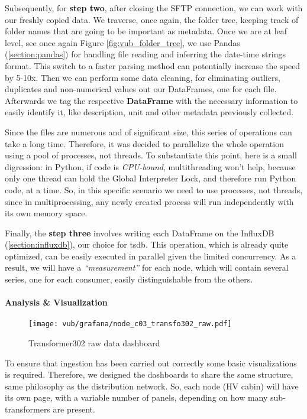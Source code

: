Subsequently, for \textbf{step two}, after closing the \ac{SFTP} connection, we can work with our freshly copied data. We traverse, once again, the folder tree, keeping track of
folder names that are going to be important as metadata. Once we are at leaf level, see once again Figure \ref{fig:vub_folder_tree}, we use 
Pandas (\ref{section:pandas}) for handling file reading and inferring the date-time strings format. This switch to a faster parsing method can potentially increase the speed by 5-10x. %
Then we can perform some data cleaning, for eliminating outliers, duplicates and non-numerical values out our DataFrames, one for each file.
Afterwards we tag the respective \textbf{DataFrame} with the necessary information to easily identify it, like description, unit and other metadata previously collected.

Since the files are numerous and of significant size, this series of operations can take a long time. 
Therefore, it was decided to parallelize the whole operation using a pool of processes, not threads. To substantiate this point, here is a small digression: 
in Python, if code is \textit{CPU-bound}, multithreading won't help, because only one thread can hold the Global Interpreter Lock, and therefore run Python code, at a time. 
So, in this specific scenario we need to use processes, not threads, since in multiprocessing, any newly created process will run independently with its own memory space.

Finally, the \textbf{step three} involves writing each DataFrame on the InfluxDB (\ref*{section:influxdb}), our choice for \acl{tsdb}.
This operation, which is already quite optimized, can be easily executed in parallel given the limited concurrency.
As a result, we will have a \textit{``measurement''} for each node, which will contain several series, one for each consumer, easily distinguishable from the others.

\paragraph{Analysis \& Visualization}
\begin{figure}[ht]
    \texttt{[image: vub/grafana/node\_c03\_transfo302\_raw.pdf]}
    \caption{Transformer302 raw data dashboard}
    \label{fig:vub_raw_rad}
\end{figure}
To ensure that ingestion has been carried out correctly some basic visualizations is required.
Therefore, we designed the dashboards to share the same structure, same philosophy as the distribution network.
So, each node (\ac{HV} cabin) will have its own page, with a variable number of panels, depending on how many sub-transformers are present. %

